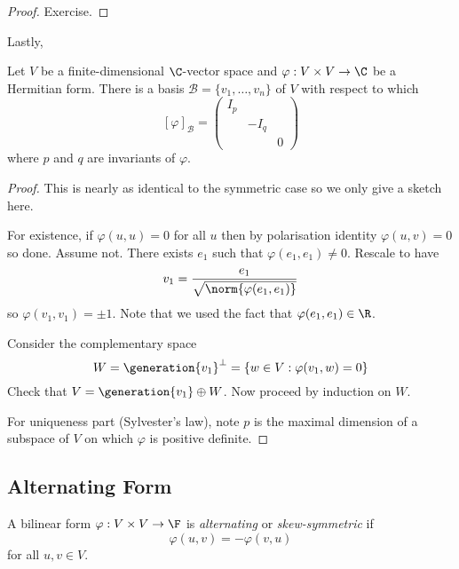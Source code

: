 \documentclass[a4paper]{article}
\newcommand*{\spans}{\generation}
\newcommand*{\basis}{\mathcal}
\theoremstyle{definition}
\begin{document}
\begin{proof}
  Exercise.
\end{proof}

Lastly,
\begin{theorem}
  Let \(V\) be a finite-dimensional \(\C\)-vector space and \(\varphi: V \times V \to \C\) be a Hermitian form. There is a basis \(\basis B = \{v_1, \dots, v_n\}\) of \(V\) with respect to which
  \[
    [\varphi]_{\basis B} =
    \begin{pmatrix}
      I_p & & \\
      & -I_q & \\
      & & 0
    \end{pmatrix}
  \]
  where \(p\) and \(q\) are invariants of \(\varphi\).
\end{theorem}

\begin{proof}
  This is nearly as identical to the symmetric case so we only give a sketch here.

  For existence, if \(\varphi(u, u) = 0\) for all \(u\) then by polarisation identity \(\varphi(u, v) = 0\) so done. Assume not. There exists \(e_1\) such that \(\varphi(e_1, e_1) \neq 0\). Rescale to have
  \[
    v_1 = \frac{e_1}{\sqrt{\norm{\varphi(e_1, e_1)}}}
  \]
  so \(\varphi(v_1, v_1) = \pm 1\). Note that we used the fact that \(\varphi(e_1, e_1) \in \R\).

  Consider the complementary space
  \[
    W = \spans{v_1}^\perp = \left\{ w \in V: \varphi(v_1, w) = 0 \right\}
  \]
  Check that \(V = \spans{v_1} \oplus W\). Now proceed by induction on \(W\).

  For uniqueness part (Sylvester's law), note \(p\) is the maximal dimension of a subspace of \(V\) on which \(\varphi\) is positive definite.
\end{proof}

\subsection{Alternating Form}

\begin{definition}
  A bilinear form \(\varphi: V \times V \to \F\) is \emph{alternating} or \emph{skew-symmetric} if
  \[
    \varphi(u, v) = - \varphi(v, u)
  \]
  for all \(u, v \in V\).
\end{definition}
\end{document}
